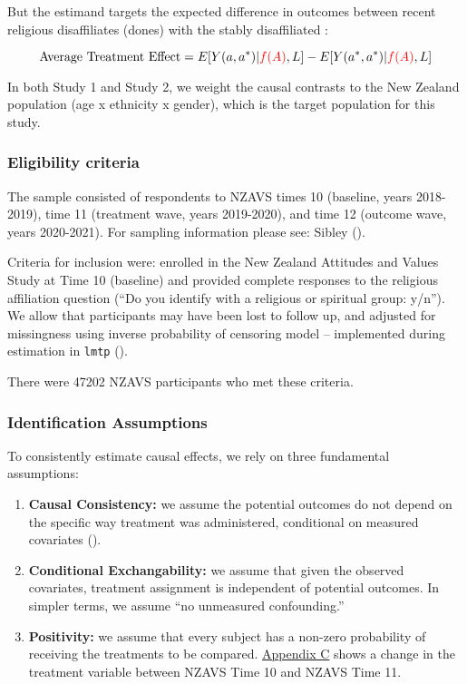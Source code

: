 \documentclass[
  singlecolumn]{article}
\begin{document}
But the estimand targets the expected difference in outcomes between
recent religious disaffiliates (dones) with the stably disaffiliated :

\[ 
\text{Average Treatment Effect} = E[Y(a,a^*)|\textcolor{red}{f(A)},L] -  E[Y(a^*, a^*)|\textcolor{red}{f(A)},L] 
\]

In both Study 1 and Study 2, we weight the causal contrasts to the New
Zealand population (age x ethnicity x gender), which is the target
population for this study.

\subsubsection{Eligibility criteria}\label{eligibility-criteria}

The sample consisted of respondents to NZAVS times 10 (baseline, years
2018-2019), time 11 (treatment wave, years 2019-2020), and time 12
(outcome wave, years 2020-2021). For sampling information please see:
Sibley ().

Criteria for inclusion were: enrolled in the New Zealand Attitudes and
Values Study at Time 10 (baseline) and provided complete responses to
the religious affiliation question (``Do you identify with a religious
or spiritual group: y/n''). We allow that participants may have been
lost to follow up, and adjusted for missingness using inverse
probability of censoring model -- implemented during estimation in
\texttt{lmtp} ().

There were 47202 NZAVS participants who met these criteria.

\subsubsection{Identification
Assumptions}\label{identification-assumptions}

To consistently estimate causal effects, we rely on three fundamental
assumptions:

\begin{enumerate}
\def\labelenumi{\arabic{enumi}.}
\item
  \textbf{Causal Consistency:} we assume the potential outcomes do not
  depend on the specific way treatment was administered, conditional on
  measured covariates ().
\item
  \textbf{Conditional Exchangability:} we assume that given the observed
  covariates, treatment assignment is independent of potential outcomes.
  In simpler terms, we assume ``no unmeasured confounding.''
\item
  \textbf{Positivity:} we assume that every subject has a non-zero
  probability of receiving the treatments to be compared.
  \hyperref[appendix-exposures]{Appendix C} shows a change in the
  treatment variable between NZAVS Time 10 and NZAVS Time 11.
\end{enumerate}
\end{document}
